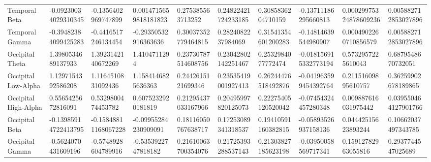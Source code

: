 \begin{longtable}{llllllllll}
Temporal Beta        &  -0.09230034029310345 &   -0.1356402969747899 &  0.0014715659818181823 &    0.275385563713252 &  0.24822421724233185 &   0.3085836204710159 &    -0.13711186295660813 &  0.00029975324878609236 &  0.005882712853027896 \\
Temporal Gamma       &  -0.39482384099425283 &   -0.4416517246134454 &   -0.29350532916363636 &  0.30037352779464815 &   0.2824082237984069 &  0.31541354601200283 &    -0.14814639544980907 &   0.0004902260710856579 &  0.005882712853027896 \\
Occipital Theta      &    1.3980534689137933 &    1.3923142140672269 &           1.4104711294 &  0.23730787514608756 &  0.23042802142251467 &   0.2532984077772474 &   -0.018156915332773194 &      0.5732957225610043 &    0.6879548670732051 \\
Occipital Low-Alpha  &    1.1297154392586208 &    1.1164510831092436 &     1.1584146825636363 &   0.2442615121699346 &  0.23535419001927413 &  0.26244476518492876 &   -0.041963599454392764 &     0.21151609895610757 &   0.36259902678189865 \\
Occipital High-Alpha &    0.5565425672816091 &    0.5329800474453782 &     0.6075232920181819 &  0.21295437033167966 &  0.20495997820125073 &  0.22275405120520042 &    -0.07454324457280348 &    0.009887616031975442 &  0.039550464127901766 \\
Occipital Beta       &  -0.13985914722413795 &  -0.15848811168067228 &   -0.09955284230909091 &  0.18116050767638717 &  0.17253089341318537 &  0.19410591160382815 &    -0.05893526937158136 &     0.04442515623893244 &   0.10662037497343785 \\
Occipital Gamma      &   -0.5624070431609196 &   -0.5748928604789916 &    -0.5353922747818182 &  0.21610063700354076 &  0.21725393288537143 &  0.21303827185623198 &    -0.03950058569717341 &     0.15912782963055816 &    0.2937744547025689 \\
\end{longtable}
